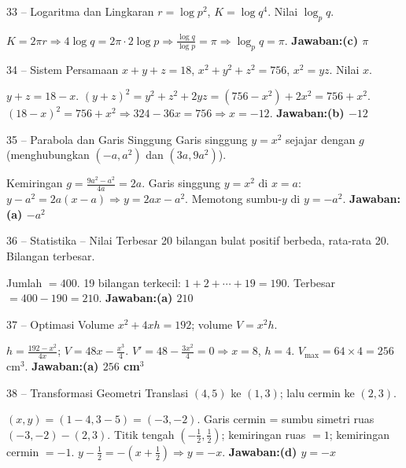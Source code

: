 \documentclass[11pt]{article}
\newcommand{\jawaban}[1]{\textbf{Jawaban:}\enspace\colorbox{gold!30}{\textbf{#1}}}
\begin{document}
\begin{soal}{33 -- Logaritma dan Lingkaran}
$r=\log p^2$, $K=\log q^4$. Nilai $\log_p q$.
\end{soal}
\begin{pembox}
$K=2\pi r\Rightarrow4\log q=2\pi\cdot2\log p\Rightarrow\frac{\log q}{\log p}=\pi\Rightarrow\log_p q=\pi$.
\jawaban{(c) $\pi$}
\end{pembox}

\begin{soal}{34 -- Sistem Persamaan}
$x+y+z=18$, $x^2+y^2+z^2=756$, $x^2=yz$. Nilai $x$.
\end{soal}
\begin{pembox}
$y+z=18-x$. $(y+z)^2=y^2+z^2+2yz=(756-x^2)+2x^2=756+x^2$.
$(18-x)^2=756+x^2\Rightarrow324-36x=756\Rightarrow x=-12$.
\jawaban{(b) $-12$}
\end{pembox}

\begin{soal}{35 -- Parabola dan Garis Singgung}
Garis singgung $y=x^2$ sejajar dengan $g$ (menghubungkan $(-a,a^2)$ dan $(3a,9a^2)$).
\end{soal}
\begin{pembox}
Kemiringan $g=\frac{9a^2-a^2}{4a}=2a$. Garis singgung $y=x^2$ di $x=a$: $y-a^2=2a(x-a)\Rightarrow y=2ax-a^2$.
Memotong sumbu-$y$ di $y=-a^2$.
\jawaban{(a) $-a^2$}
\end{pembox}

\begin{soal}{36 -- Statistika -- Nilai Terbesar}
20 bilangan bulat positif berbeda, rata-rata 20. Bilangan terbesar.
\end{soal}
\begin{pembox}
Jumlah $=400$. 19 bilangan terkecil: $1+2+\cdots+19=190$. Terbesar $=400-190=210$.
\jawaban{(a) $210$}
\end{pembox}

\begin{soal}{37 -- Optimasi Volume}
$x^2+4xh=192$; volume $V=x^2h$.
\end{soal}
\begin{pembox}
$h=\frac{192-x^2}{4x}$; $V=48x-\frac{x^3}{4}$. $V'=48-\frac{3x^2}{4}=0\Rightarrow x=8$, $h=4$.
$V_{\max}=64\times4=256$ cm$^3$.
\jawaban{(a) $256$ cm$^3$}
\end{pembox}

\begin{soal}{38 -- Transformasi Geometri}
Translasi $(4,5)$ ke $(1,3)$; lalu cermin ke $(2,3)$.
\end{soal}
\begin{pembox}
$(x,y)=(1-4,3-5)=(-3,-2)$. Garis cermin = sumbu simetri ruas $(-3,-2)-(2,3)$.
Titik tengah $(-\frac12,\frac12)$; kemiringan ruas $=1$; kemiringan cermin $=-1$.
$y-\frac12=-(x+\frac12)\Rightarrow y=-x$.
\jawaban{(d) $y=-x$}
\end{pembox}
\end{document}

